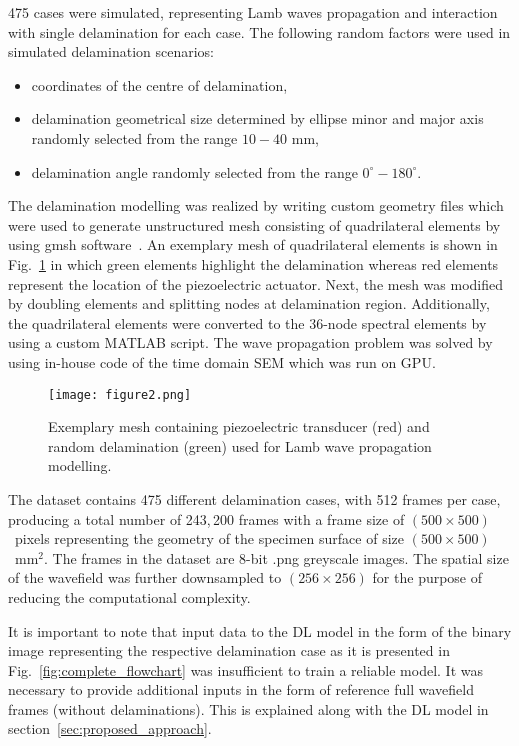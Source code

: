 475 cases were simulated, representing Lamb waves propagation and interaction 
with single delamination for each case. 
The following random factors were used in simulated delamination scenarios:
\begin{itemize}
	\item coordinates of the centre of delamination,
	\item delamination geometrical size	determined by ellipse minor and major axis randomly selected from the range $10-40$ mm,
	\item delamination angle randomly selected from the range $ 0^{\circ}-180^{\circ}$.
	
\end{itemize}
The delamination modelling was realized by writing custom geometry files which were used to generate unstructured mesh consisting of quadrilateral elements by using gmsh software~\cite{Geuzaine2009}.
An exemplary mesh of quadrilateral elements is shown in Fig.~\ref{fig:random_delam_mesh} in which green elements highlight the delamination whereas red elements represent the location of the piezoelectric actuator.
Next, the mesh was modified by doubling elements and splitting nodes at delamination region.
Additionally, the quadrilateral elements were converted to the 36-node spectral elements by using a custom MATLAB script.
The wave propagation problem was solved by using in-house code of the time domain SEM which was run on GPU.
\begin{figure} [h!]
	\begin{center}
		\texttt{[image: figure2.png]}
	\end{center}
	\caption{Exemplary mesh containing piezoelectric transducer (red) and random delamination (green) used for Lamb wave propagation modelling.} 
	\label{fig:random_delam_mesh}
\end{figure}
The dataset contains 475 different delamination cases, with 512 frames per case, producing a total number of 243,\,200 frames with a frame size of \((500\times500)\)~pixels representing the geometry of the specimen surface of size \((500\times500)\)~mm\(^{2}\).
The frames in the dataset are 8-bit .png greyscale images.
The spatial size of the wavefield was further downsampled to \((256\times256)\) for the purpose of 
reducing the computational complexity.

It is important to note that input data to the DL model in the form of the binary image representing the respective delamination case as it is presented in Fig.~\ref{fig:complete_flowchart} was insufficient to train a reliable model.
It was necessary to provide additional inputs in the form of reference full wavefield frames (without delaminations).
This is explained along with the DL model in section~\ref{sec:proposed_approach}.
